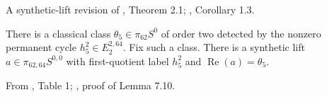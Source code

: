 \begin{proposition}
\label{sem:Literature:theta-five}
A synthetic-lift revision of \cite{BJMtheta5}, Theorem 2.1; \cite{Xu}, Corollary 1.3.\par

There is a classical class $\theta_5\in\pi_{62}S^0$ of order two detected by the nonzero permanent cycle $h_5^2\in E_2^{2,64}$. Fix such a class. There is a synthetic lift $a\in\pi_{62,64}S^{0,0}$ with first-quotient label $h_5^2$ and $\operatorname{Re}(a)=\theta_5$.

From \cite{IWX}, Table 1; \cite{LWX126}, proof of Lemma 7.10.\par


\end{proposition}
